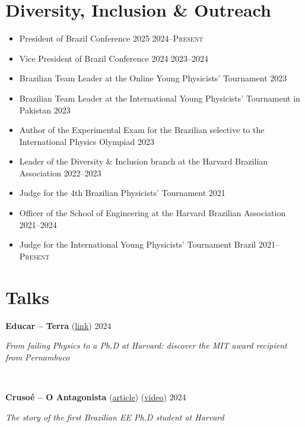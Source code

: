 \documentclass[letterpaper,10pt]{article}
\newcommand{\entry}[4]{

\begin{minipage}[t]{.15\textwidth}
\end{minipage}
\hfill\vline\hfill 
\begin{minipage}[t]{0.95\textwidth}
#2 \hfill \textsc{#1}

\textit{#3}

\footnotesize{#4}
\end{minipage}\\\vspace{.25cm}}
\begin{document}
\section{Diversity, Inclusion \& Outreach}
\begin{itemize}
	\item President of Brazil Conference 2025
    \hfill\textsc{2024--Present}

    \item Vice President of Brazil Conference 2024
    \hfill\textsc{2023--2024}

    \item Brazilian Team Leader at the Online Young Physicists' Tournament
    \hfill\textsc{2023}

	\item Brazilian Team Leader at the International Young Physicists' Tournament in Pakistan
    \hfill\textsc{2023}

    \item Author of the Experimental Exam for the Brazilian selective to the International Physics Olympiad
    \hfill\textsc{2023}

    \item Leader of the Diversity \& Inclusion branch at the Harvard Brazilian Association
	\hfill\textsc{2022--2023}

    \item Judge for the 4th Brazilian Physicists' Tournament
    \hfill\textsc{2021}

    \item Officer of the School of Engineering at the Harvard Brazilian Association
	\hfill\textsc{2021--2024}

    \item Judge for the International Young Physicists' Tournament Brazil
	\hfill\textsc{2021--Present}
	\end{itemize}
\vspace*{-.25cm}
\section{Talks}
\entry{2024}{\textbf{Educar -- Terra} (\href{https://www.terra.com.br/noticias/educacao/da-recuperacao-em-fisica-ao-phd-em-harvard-conheca-a-historia-do-pernambucano-premiado-pelo-mit,3ed69c5460e41efbfe796dffdf6c47c4shi065se.html}{link})}{From failing Physics to a Ph.D at Harvard: discover the MIT award recipient from Pernambuco}{}

\entry{2024}{\textbf{Crusoé -- O Antagonista} (\href{https://crusoe.com.br/edicoes/325/a-historia-do-primeiro-brasileiro-phd-em-engenharia-em-harvard/}{article}) (\href{https://www.youtube.com/watch?v=wmis_W-EFKk}{video})}{The story of the first Brazilian EE Ph.D student at Harvard}{}
\end{document}
